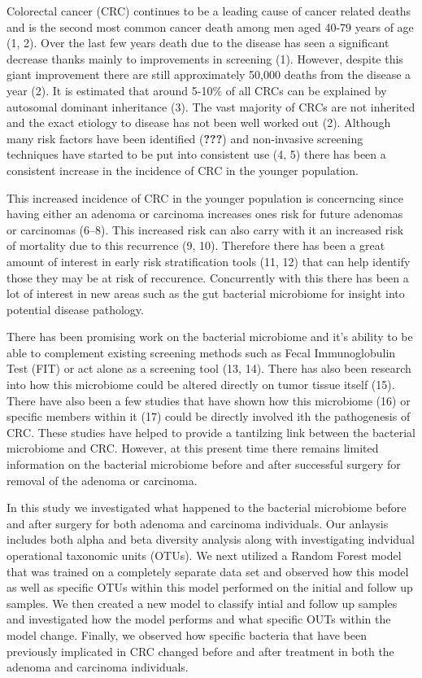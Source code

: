 \documentclass[12pt,]{article}
\begin{document}
Colorectal cancer (CRC) continues to be a leading cause of cancer
related deaths and is the second most common cancer death among men aged
40-79 years of age (1, 2). Over the last few years death due to the
disease has seen a significant decrease thanks mainly to improvements in
screening (1). However, despite this giant improvement there are still
approximately 50,000 deaths from the disease a year (2). It is estimated
that around 5-10\% of all CRCs can be explained by autosomal dominant
inheritance (3). The vast majority of CRCs are not inherited and the
exact etiology to disease has not been well worked out (2). Although
many risk factors have been identified ({\textbf{???}}) and non-invasive
screening techniques have started to be put into consistent use (4, 5)
there has been a consistent increase in the incidence of CRC in the
younger population.

This increased incidence of CRC in the younger population is concerncing
since having either an adenoma or carcinoma increases ones risk for
future adenomas or carcinomas (6--8). This increased risk can also carry
with it an increased risk of mortality due to this recurrence (9, 10).
Therefore there has been a great amount of interest in early risk
stratification tools (11, 12) that can help identify those they may be
at risk of reccurence. Concurrently with this there has been a lot of
interest in new areas such as the gut bacterial microbiome for insight
into potential disease pathology.

There has been promising work on the bacterial microbiome and it's
ability to be able to complement existing screening methods such as
Fecal Immunoglobulin Test (FIT) or act alone as a screening tool (13,
14). There has also been research into how this microbiome could be
altered directly on tumor tissue itself (15). There have also been a few
studies that have shown how this microbiome (16) or specific members
within it (17) could be directly involved ith the pathogenesis of CRC.
These studies have helped to provide a tantilzing link between the
bacterial microbiome and CRC. However, at this present time there
remains limited information on the bacterial microbiome before and after
successful surgery for removal of the adenoma or carcinoma.

In this study we investigated what happened to the bacterial microbiome
before and after surgery for both adenoma and carcinoma individuals. Our
anlaysis includes both alpha and beta diversity analysis along with
investigating indvidual operational taxonomic units (OTUs). We next
utilized a Random Forest model that was trained on a completely separate
data set and observed how this model as well as specific OTUs within
this model performed on the initial and follow up samples. We then
created a new model to classify intial and follow up samples and
investigated how the model performs and what specific OUTs within the
model change. Finally, we observed how specific bacteria that have been
previously implicated in CRC changed before and after treatment in both
the adenoma and carcinoma individuals.
\end{document}
